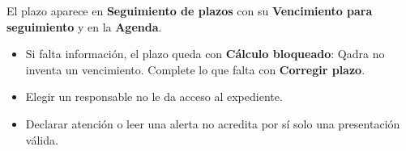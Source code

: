 \resultado El plazo aparece en \textbf{Seguimiento de plazos} con su
\textbf{Vencimiento para seguimiento} y en la \textbf{Agenda}.

\begin{itemize}
  \item Si falta información, el plazo queda con \textbf{Cálculo bloqueado}:
        Qadra no inventa un vencimiento. Complete lo que falta con
        \textbf{Corregir plazo}.
  \item Elegir un responsable no le da acceso al expediente.
  \item Declarar atención o leer una alerta no acredita por sí solo una
        presentación válida.
\end{itemize}
